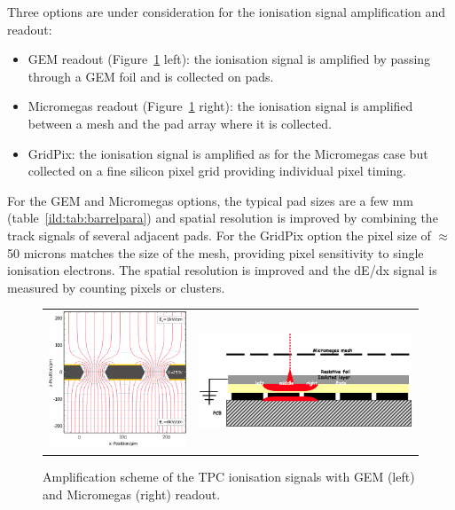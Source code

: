 Three options are under consideration for the ionisation signal amplification and readout:
\begin{itemize}
    \item GEM readout (Figure~\ref{fig:det:TPC_readout} left): the ionisation signal is amplified by passing through a GEM foil and is collected on pads.
    \item Micromegas readout (Figure~\ref{fig:det:TPC_readout} right): the ionisation signal is amplified between a mesh and the pad array where it is collected.
    \item GridPix: the ionisation signal is amplified as for the Micromegas case but collected on a fine silicon pixel grid providing individual pixel timing.
\end{itemize}
\vspace{0.5cm}
For the GEM and Micromegas options, the typical pad sizes are a few mm (table~\ref{ild:tab:barrelpara}) and spatial resolution is improved by combining the track signals of several adjacent pads. For the GridPix option the pixel size of $\approx$50 microns matches the size of the mesh, providing pixel sensitivity to single ionisation electrons. The spatial resolution is improved and the dE/dx signal is measured by counting pixels or clusters. 

\begin{figure}[t!]
\begin{tabular}{cc}
\includegraphics[width=0.5\hsize,viewport={0 -10 600 500},clip]{Detector/fig/GEM.png} &
\includegraphics[width=0.4\hsize]{Detector/fig/micromegas.png}
\end{tabular}
\caption[TPC readout]{Amplification scheme of the TPC ionisation signals with GEM (left) and Micromegas (right) readout.}
\label{fig:det:TPC_readout}
\end{figure}

